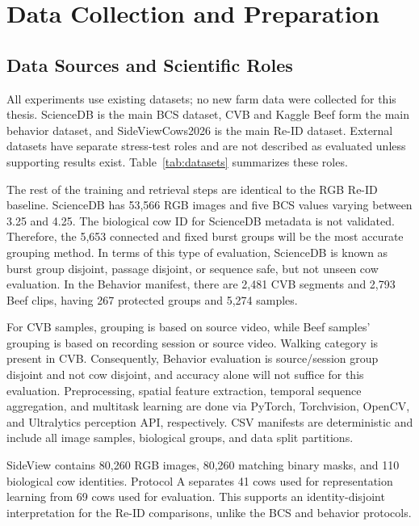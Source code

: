 \section{Data Collection and Preparation}

\subsection{Data Sources and Scientific Roles}

All experiments use existing datasets; no new farm data were collected for this thesis. ScienceDB is the main BCS dataset, CVB and Kaggle Beef form the main behavior dataset, and SideViewCows2026 is the main Re-ID dataset. External datasets have separate stress-test roles and are not described as evaluated unless supporting results exist. Table~\ref{tab:datasets} summarizes these roles.



The rest of the training and retrieval steps are identical to the RGB Re-ID baseline. ScienceDB has 53,566 RGB images and five BCS values varying between 3.25 and 4.25. The biological cow ID for ScienceDB metadata is not validated. Therefore, the 5,653 connected and fixed burst groups will be the most accurate grouping method. In terms of this type of evaluation, ScienceDB is known as burst group disjoint, passage disjoint, or sequence safe, but not unseen cow evaluation. In the Behavior manifest, there are 2,481 CVB segments and 2,793 Beef clips, having 267 protected groups and 5,274 samples.

For CVB samples, grouping is based on source video, while Beef samples' grouping is based on recording session or source video. Walking category is present in CVB. Consequently, Behavior evaluation is source/session group disjoint and not cow disjoint, and accuracy alone will not suffice for this evaluation. Preprocessing, spatial feature extraction, temporal sequence aggregation, and multitask learning are done via PyTorch, Torchvision, OpenCV, and Ultralytics perception API, respectively. CSV manifests are deterministic and include all image samples, biological groups, and data split partitions.

SideView contains 80,260 RGB images, 80,260 matching binary masks, and 110 biological cow identities. Protocol A separates 41 cows used for representation learning from 69 cows used for evaluation. This supports an identity-disjoint interpretation for the Re-ID comparisons, unlike the BCS and behavior protocols.

